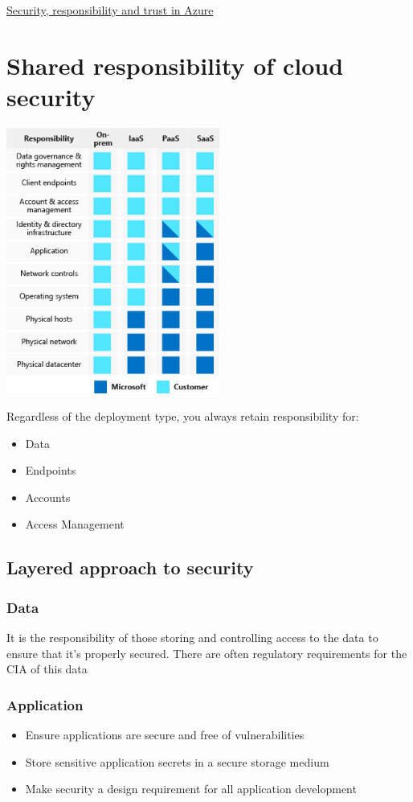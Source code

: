\documentclass{article}[18pt]
\begin{document}
\begin{center}
\underline{\huge Security, responsibility and trust in Azure}
\end{center}
\section{Shared responsibility of cloud security}
\begin{center}
	\includegraphics[width=7cm]{2-shared_responsibilities}
\end{center}
Regardless of the deployment type, you always retain responsibility for:
\begin{itemize}
	\item Data
	\item Endpoints
	\item Accounts
	\item Access Management
\end{itemize}
\subsection{Layered approach to security}
\subsubsection{Data}
It is the responsibility of those storing and controlling access to the data to ensure that it's properly secured. There are often regulatory requirements for the CIA of this data
\subsubsection{Application}
\begin{itemize}
	\item Ensure applications are secure and free of vulnerabilities
	\item Store sensitive application secrets in a secure storage medium
	\item Make security a design requirement for all application development
\end{itemize}
\end{document}
